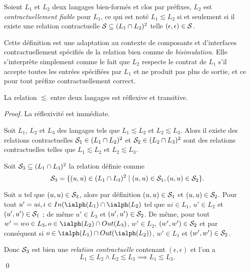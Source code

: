 \begin{definition}
\label{def:fiabilitecontrat}
    Soient $L_1$ et $L_2$ deux langages bien-form\'es et clos par
    pr\'efixes, 
    $L_2$ est \emph{contractuellement fiable} pour $L_1$,  ce qui est not\'e
    $L_1 \lesssim L_2$ si et seulement si il existe une relation
    contractuelle ${\cal S}\subseteq (L_1 \cap L_2)^2$ telle
    $(\epsilon,\epsilon) \in {\cal S}$.  
\end{definition}

Cette d\'efinition est une adaptation au contexte de composants et d'interfaces contractuellement
sp\'ecifi\'es de la relation bien connue de
\emph{bisimulation}\cite{milner-ccs}. Elle s'interpr\`ete simplement
comme le fait que $L_2$ respecte le contrat de $L_1$ s'il accepte
toutes les entr\'ees sp\'ecifi\'ees par $L_1$ et ne produit pas
plus de sortie, et ce pour tout pr\'efixe contractuellement
correct. 

\begin{prop}
    La relation $\lesssim$ entre deux langages est r\'eflexive et
    transitive.
\end{prop}

\begin{proof}
    La r\'eflexivit\'e est imm\'ediate. 
    
    Soit $L_1$, $L_2$ et $L_3$ des langages 
    tels que $L_1 \lesssim L_2$ et $L_2 \lesssim  L_3$. Alors il
    existe des relations contractuelles ${\cal S}_1\in (L_1 \cap L_2)^2$ et ${\cal
    S}_2 \in (L_2\cap  L_3)^2$  sont des relations
    contractuelles telles que $L_1 \lesssim L_2$ et $L_2 \lesssim L_3$.
    
Soit  ${\cal S}_3\subseteq (L_1 \cap L_3)^2$ la relation d\'efinie
    comme 
    $$
    {\cal S}_3 = \{(u,u) \in (L_1 \cap L_3)^2 \mid 
    (u,u)\in {\cal S}_1 , (u,u) \in {\cal S}_2\}.
    $$ 

    Soit $u$ tel que $(u,u) \in {\cal S}_3$, alors par d\'efinition
    $(u,u)\in {\cal S}_1$ et $(u,u) \in {\cal S}_2$.     
    Pour tout $u'=ui,i \in In(\ialph(L_1)\cap \ialph(L_2)$ tel que $ui\in L_1$, 
    $u'\in L_2$ et $(u',u')\in {\cal S}_1$ ; de m\^eme $u'\in L_3$ et $(u',u')\in {\cal
    S}_2$. De m\^eme, pour tout $w'=wo\in L_3, o \in
    \ialph(L_2) \cap Out(L_3)$,  $w'\in L_2$, $(w',w')
    \in {\cal S}_2$  et par
    cons\'equent si $o\in  \ialph(L_1) \cap Out(\ialph(L_2))$, $w' \in L_1$  et $(w',w')\in {\cal S}_2$. 
    
    Donc ${\cal S}_3$ est bien une \emph{relation contractuelle}
    contenant $(\epsilon,\epsilon)$ et
    l'on a 
    $$
    L_1\lesssim L_2 \wedge L_2 \lesssim L_3 \implies L_1\lesssim L_3.
    $$
\hfill \qed
\end{proof}

